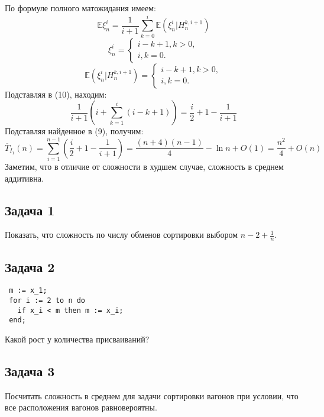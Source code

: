 \documentclass[11pt]{article}
\newcounter{th}\setcounter{th}{0}
\begin{document}
По формуле полного матожидания имеем:
\begin{equation}
\mathbb{E}\xi_n^i = \frac1{i + 1}\sum_{k = 0}^i\mathbb{E}(\xi_n^i | H_n^{k, i + 1})
\end{equation}
\begin{equation}
\xi_n^i = \begin{cases}
i - k + 1, k > 0, \\
i, k = 0.
\end{cases}
\end{equation}
\begin{equation}
\mathbb{E}(\xi_n^i | H_n^{k, i + 1}) = \begin{cases}
i - k + 1, k > 0, \\
i, k = 0.
\end{cases}
\end{equation}
Подставляя в (10), находим:
\begin{equation}
\frac1{i + 1}\left(i + \sum_{k = 1}^i(i - k + 1)\right) = \frac{i}2 + 1 - \frac1{i + 1}
\end{equation}
Подставляя найденное в (9), получим:
\begin{equation}
\overline{T}_{I_1}(n) = \sum_{i = 1}^{n - 1}\left(\frac{i}2 + 1 - \frac1{i + 1}\right)
= \frac{(n + 4)(n - 1)}4 - \ln n + O(1) = \frac{n^2}4 + O(n)
\end{equation}
Заметим, что в отличие от сложности в худшем случае, сложность в среднем аддитивна.
\subsection{Задача 1}
\label{sec:org879f0e2}
Показать, что сложность по числу обменов сортировки выбором \(n - 2 + \frac1n\).
\subsection{Задача 2}
\label{sec:org3bb8508}
\begin{lstlisting}
 m := x_1;
 for i := 2 to n do
   if x_i < m then m := x_i;
 end;
\end{lstlisting}
Какой рост у количества присваиваний?
\subsection{Задача 3}
\label{sec:org0eb7b5a}
Посчитать сложность в среднем для задачи сортировки вагонов при условии, что все расположения
вагонов равновероятны.
\end{document}
